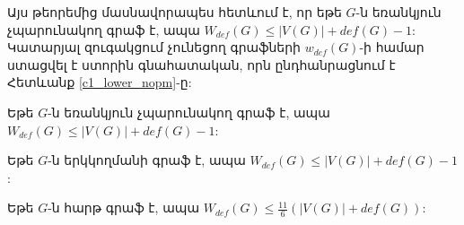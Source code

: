 Այս թեորեմից մասնավորապես հետևում է, որ եթե $G$-ն եռանկյուն չպարունակող գրաֆ է, ապա
$W_{def}(G)\leq \vert V(G)\vert +def(G)-1$: Կատարյալ զուգակցում չունեցող գրաֆների $w_{def}(G)$-ի համար ստացվել է ստորին գնահատական, որն ընդհանրացնում է Հետևանք \ref{c1_lower_nopm}-ը:
\begin{hide}
\begin{corollary}
\label{c3_Wdef_notriangle} Եթե $G$-ն եռանկյուն չպարունակող գրաֆ է, ապա
$W_{def}(G)\leq \vert V(G)\vert +def(G)-1$:
\end{corollary}

\begin{corollary}
\label{c3_Wdef_bipartite} Եթե $G$-ն երկկողմանի գրաֆ է, ապա
$W_{def}(G)\leq \vert V(G)\vert +def(G)-1$:
\end{corollary}

\begin{corollary}
\label{c3_Wdef_planar} Եթե $G$-ն հարթ գրաֆ է, ապա
$W_{def}(G)\leq \frac{11}{6}\left(\vert V(G)\vert +def(G)\right)$:
\end{corollary}
\end{hide}

